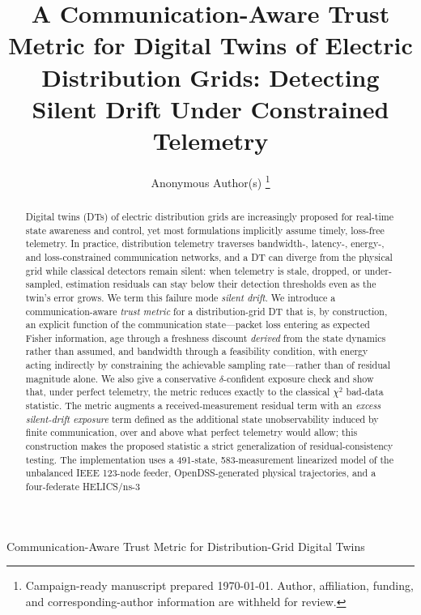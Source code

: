 \documentclass[journal]{IEEEtran}
\theoremstyle{plain}
\theoremstyle{definition}
\theoremstyle{remark}
\begin{document}
\title{A Communication-Aware Trust Metric for Digital Twins of Electric
Distribution Grids: Detecting Silent Drift Under Constrained Telemetry}

\author{Anonymous Author(s)%
\thanks{Campaign-ready manuscript prepared \today. Author, affiliation,
funding, and corresponding-author information are withheld for review.}}

%
{Communication-Aware Trust Metric for Distribution-Grid Digital Twins}

\maketitle

\begin{abstract}
Digital twins (DTs) of electric distribution grids are increasingly
proposed for real-time state awareness and control, yet most formulations
implicitly assume timely, loss-free telemetry. In practice, distribution
telemetry traverses bandwidth-, latency-, energy-, and loss-constrained
communication networks, and a DT can diverge from the physical grid while
classical detectors remain silent: when telemetry is stale, dropped, or
under-sampled, estimation residuals can stay below their detection
thresholds even as the twin's error grows. We term this failure mode
\emph{silent drift}. We introduce a communication-aware \emph{trust
metric} for a distribution-grid DT that is, by construction, an explicit
function of the communication state---packet loss entering as expected
Fisher information, age through a freshness discount \emph{derived} from
the state dynamics rather than assumed, and bandwidth through a
feasibility condition, with energy acting indirectly by constraining the
achievable sampling rate---rather than of residual magnitude alone. We
also give a conservative $\delta$-confident exposure check and show that,
under perfect telemetry, the metric reduces exactly to the classical
$\chi^{2}$ bad-data statistic. The metric augments a
received-measurement residual term with an \emph{excess silent-drift
exposure} term defined as the additional state unobservability induced by
finite communication, over and above what perfect telemetry would allow;
this construction makes the proposed statistic a strict generalization of
residual-consistency testing. The implementation uses a 491-state,
583-measurement linearized model of the unbalanced IEEE 123-node feeder,
OpenDSS-generated physical trajectories, and a four-federate HELICS/ns-3

\end{abstract}
\end{document}
